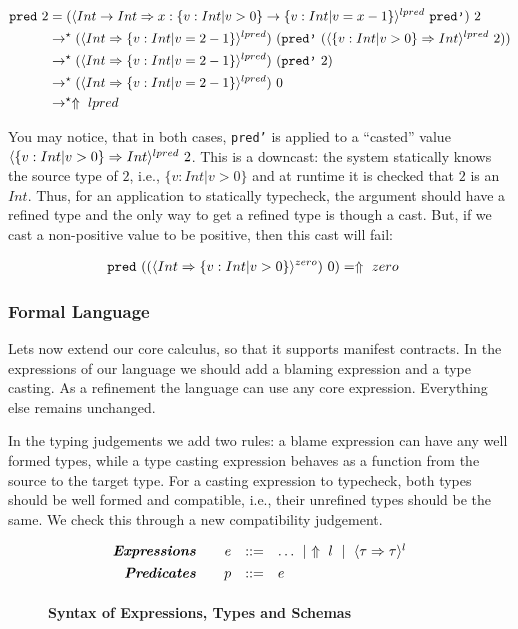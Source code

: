 \begin{align*}
\texttt{pred}\ 2 &=
(\ecast{Int \rightarrow Int}{x:\{v:Int | v > 0\} -> \{v:Int | v = x - 1\}}{lpred} \ \texttt{pred'})\ 2 \\
&\rightarrow^\star (\ecast{Int}{\{v:Int | v = 2 - 1\}}{lpred}) \ (\texttt{pred'}\ (\ecast{\{v:Int | v > 0\}}{Int}{lpred} \ 2)) \\ 
&\rightarrow^\star (\ecast{Int}{\{v:Int | v = 2 - 1\}}{lpred}) \ (\texttt{pred'}\ 2) \\ 
&\rightarrow^\star (\ecast{Int}{\{v:Int | v = 2 - 1\}}{lpred}) \ 0 \\ 
&\rightarrow^\star \elabel{lpred} \\ 
\end{align*}




You may notice, that in both cases, \texttt{pred'} is applied to a ``casted'' value
$\langle \{v:Int | v > 0\} \Rightarrow Int \rangle^{lpred} \ 2$.
This is a downcast: the system statically knows the source type of $2$, i.e., 
$\{v:Int | v > 0\}$ and at runtime it is checked that $2$ is an $Int$.
Thus, for an application to statically typecheck, the argument should 
have a refined type and the only way to get a refined type is though a cast.
But, if we cast a non-positive value to be positive,
then this cast will fail:

\begin{align*}
\texttt{pred} \ ((\langle Int \Rightarrow \{v:Int | v > 0\} \rangle^{zero})\ 0) &= \Uparrow \ zero
\end{align*}


\subsubsection{Formal Language}
Lets now extend our core calculus, so that it supports manifest contracts.
%
In the expressions of our language we should add a blaming expression
and a type casting.
As a refinement the language can use any core expression.
Everything else remains unchanged.


In the typing judgements we add two rules:
a blame expression can have any well formed types, 
while a type casting expression behaves as a function from the 
source to the target type.
For a casting expression to typecheck, both types should be 
well formed and compatible, i.e., their unrefined types should be 
the same. We check this through a new compatibility judgement.

\begin{figure}[ht!]
\centering
$$
\begin{array}{rrcl}
\emphbf{Expressions} \quad 
  & e 
  & ::= 
  & 		 \dots
  \spmid \elabel{l} 
  \spmid \ecast{\tau}{\tau}{l} 
  \\[0.05in] 

\emphbf{Predicates} \quad 
  & p
  & ::= 
  &		e
  \\[0.05in] 

\end{array}
$$
\caption{\textbf{Syntax of Expressions, Types and Schemas}}
\label{fig:syntax}
\end{figure}


